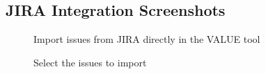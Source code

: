 \documentclass{article}
\begin{document}
\begin{appendices}
\section{JIRA Integration Screenshots}

\begin{figure}[H]
    \centering
    \captionsetup{labelformat=empty}
    \caption{Import issues from JIRA directly in the VALUE tool}
    \noindent{}
\end{figure}

\begin{figure}[H]
    \centering
    \captionsetup{labelformat=empty}
    \caption{Select the issues to import}
    \noindent{}
\end{figure}


\end{appendices}
\end{document}
